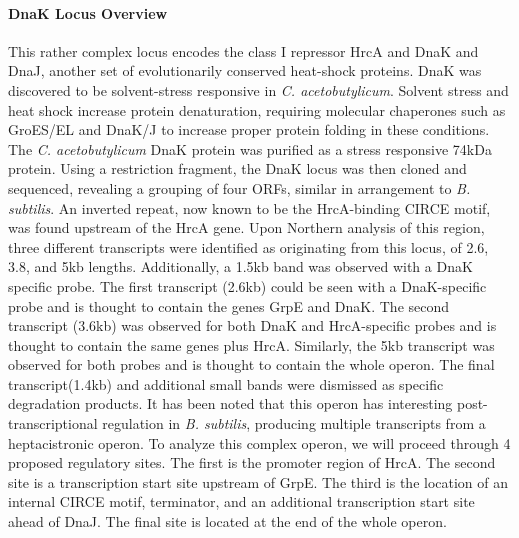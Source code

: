 \paragraph{DnaK Locus Overview}
This rather complex locus encodes the class I repressor HrcA and DnaK and DnaJ, another set of evolutionarily conserved heat-shock proteins. DnaK was discovered to be solvent-stress responsive in \textit{C. acetobutylicum}\cite{73,74}. Solvent stress and heat shock increase protein denaturation, requiring molecular chaperones such as GroES/EL and DnaK/J to increase proper protein folding in these conditions. The \textit{C. acetobutylicum} DnaK protein was purified as a stress responsive 74kDa protein\cite{74}. Using a restriction fragment, the DnaK locus was then cloned and sequenced\cite{79}, revealing a grouping of four ORFs, similar in arrangement to \textit{B. subtilis}\cite{76}. An inverted repeat, now known to be the HrcA-binding CIRCE motif, was found upstream of the HrcA gene\cite{79}. Upon Northern analysis of this region, three different transcripts were identified as originating from this locus, of 2.6, 3.8, and 5kb lengths. Additionally, a 1.5kb band was observed with a DnaK specific probe\cite{79}. The first transcript (2.6kb) could be seen with a DnaK-specific probe and is thought to contain the genes GrpE and DnaK. The second transcript (3.6kb) was observed for both DnaK and HrcA-specific probes and is thought to contain the same genes plus HrcA. Similarly, the 5kb transcript was observed for both probes and is thought to contain the whole operon. The final transcript(1.4kb) and additional small bands were dismissed as specific degradation products. It has been noted that this operon has interesting post-transcriptional regulation in \textit{B. subtilis}, producing multiple transcripts from a heptacistronic operon\cite{82}. To analyze this complex operon, we will proceed through 4 proposed regulatory sites. The first is the promoter region of HrcA. The second site is a transcription start site upstream of GrpE. The third is the location of an internal CIRCE motif, terminator, and an additional transcription start site ahead of DnaJ. The final site is located at the end of the whole operon.

